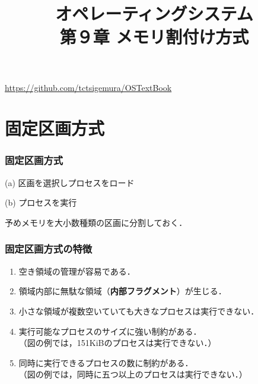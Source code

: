 \documentclass[handout]{beamer}                   %
\begin{document}
\title[メモリ割付け方式]
      {オペレーティングシステム\\第９章 メモリ割付け方式}
\date{}
\begin{frame}
  \titlepage
  \centerline{\url{https://github.com/tctsigemura/OSTextBook}}
\end{frame}


\section{固定区画方式}
\begin{frame}
  \frametitle{固定区画方式}
  \begin{minipage}{0.49\columnwidth}
    \centerline{(a) 区画を選択しプロセスをロード}
  \end{minipage}
  \begin{minipage}{0.49\columnwidth}
    \centerline{(b) プロセスを実行}
  \end{minipage}
  \vfill
  予めメモリを大小数種類の区画に分割しておく．
  \vfill
\end{frame}

\begin{frame}
  \frametitle{固定区画方式の特徴}
  \begin{enumerate}
  \item 空き領域の管理が容易である．
  \item 領域内部に無駄な領域（{\bf 内部フラグメント}）が生じる．
  \item 小さな領域が複数空いていても大きなプロセスは実行できない．
  \item 実行可能なプロセスのサイズに強い制約がある．\\
    （図の例では，151KiBのプロセスは実行できない．）
  \item 同時に実行できるプロセスの数に制約がある．\\
    （図の例では，同時に五つ以上のプロセスは実行できない．）
  \end{enumerate}
\end{frame}
\end{document}

